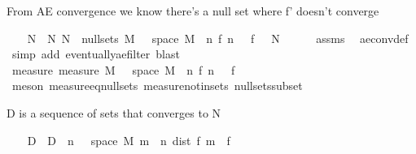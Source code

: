 \begin{isabellebody}
\begin{isamarkuptext}%
From AE convergence we know there's a null set where f' doesn't converge%
\end{isamarkuptext}\isamarkuptrue%
\ \ \isamarkupfalse%
\ N\ \ N{\isacharcolon}{\kern0pt}\ {\isachardoublequoteopen}N\ {\isasymin}\ null{\isacharunderscore}{\kern0pt}sets\ M{\isachardoublequoteclose}\ {\isachardoublequoteopen}{\isacharbraceleft}{\kern0pt}{\isasymomega}\ {\isasymin}\ space\ M{\isachardot}{\kern0pt}\ {\isasymnot}\ {\isacharparenleft}{\kern0pt}{\isasymlambda}n{\isachardot}{\kern0pt}\ f{\isacharprime}{\kern0pt}\ n\ {\isasymomega}{\isacharparenright}{\kern0pt}\ {\isasymlonglonglongrightarrow}\ f\ {\isasymomega}{\isacharbraceright}{\kern0pt}\ {\isasymsubseteq}\ N{\isachardoublequoteclose}\isanewline
\ \ \ \ \isamarkupfalse%
\ assms\ \isamarkupfalse%
\ ae{\isacharunderscore}{\kern0pt}conv{\isacharunderscore}{\kern0pt}def\ \isamarkupfalse%
\ {\isacharparenleft}{\kern0pt}simp\ add{\isacharcolon}{\kern0pt}\ eventually{\isacharunderscore}{\kern0pt}ae{\isacharunderscore}{\kern0pt}filter{\isacharcomma}{\kern0pt}\ blast{\isacharparenright}{\kern0pt}\isanewline
\ \ \isamarkupfalse%
\ \isamarkupfalse%
\ measure{\isacharunderscore}{\kern0pt}{}{\isacharcolon}{\kern0pt}\ {\isachardoublequoteopen}measure\ M\ {\isacharbraceleft}{\kern0pt}{\isasymomega}\ {\isasymin}\ space\ M{\isachardot}{\kern0pt}\ {\isasymnot}\ {\isacharparenleft}{\kern0pt}{\isasymlambda}n{\isachardot}{\kern0pt}\ f{\isacharprime}{\kern0pt}\ n\ {\isasymomega}{\isacharparenright}{\kern0pt}\ {\isasymlonglonglongrightarrow}\ f\ {\isasymomega}{\isacharbraceright}{\kern0pt}\ {\isacharequal}{\kern0pt}\ {}{\isachardoublequoteclose}\isanewline
\ \ \ \ \isamarkupfalse%
\ {\isacharparenleft}{\kern0pt}meson\ measure{\isacharunderscore}{\kern0pt}eq{\isacharunderscore}{\kern0pt}{}{\isacharunderscore}{\kern0pt}null{\isacharunderscore}{\kern0pt}sets\ measure{\isacharunderscore}{\kern0pt}notin{\isacharunderscore}{\kern0pt}sets\ null{\isacharunderscore}{\kern0pt}sets{\isacharunderscore}{\kern0pt}subset{\isacharparenright}{\kern0pt}%
\begin{isamarkuptext}%
D is a sequence of sets that converges to N%
\end{isamarkuptext}\isamarkuptrue%
\ \ \isamarkupfalse%
\ D\ \ {\isachardoublequoteopen}D\ {\isasymequiv}\ {\isasymlambda}n{\isachardot}{\kern0pt}\ {\isacharbraceleft}{\kern0pt}{\isasymomega}\ {\isasymin}\ space\ M{\isachardot}{\kern0pt}\ {\isasymexists}m\ {\isasymge}\ n{\isachardot}{\kern0pt}\ dist\ {\isacharparenleft}{\kern0pt}f{\isacharprime}{\kern0pt}\ m\ {\isasymomega}{\isacharparenright}{\kern0pt}\ {\isacharparenleft}{\kern0pt}f\ {\isasymomega}{\isacharparenright}{\kern0pt}\ {\isachargreater}{\kern0pt}\ {\isasymepsilon}{\isacharbraceright}{\kern0pt}{\isachardoublequoteclose}\isanewline

\end{isabellebody}
